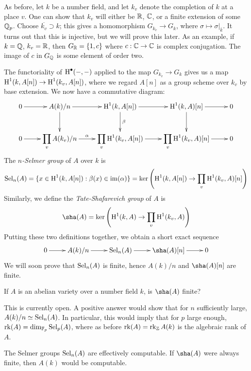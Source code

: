 \documentclass{article}
\begin{document}
As before, let $k$ be a number field, and let $k_v$ denote the completion of 
$k$ at a place $v$. One can show that $k_v$ will either be $\mathbb{R}$, $\mathbb{C}$, or a 
finite extension of some $\mathbb{Q}_p$. Choose $\overline{k_v}\supset k$; this gives 
a homomorphism $G_{k_v} \to G_k$, where $\sigma\mapsto \sigma|_{\bar k}$. It 
turns out that this is injective, but we will prove this later. As an example, 
if $k=\mathbb{Q}$, $k_v=\mathbb{R}$, then $G_{\mathbb{R}}=\{1,c\}$ where $c:\mathbb{C}\to \mathbb{C}$ is complex 
conjugation. The image of $c$ in $G_{\mathbb{Q}}$ is some element of order two. 

The functoriality of $\operatorname{H}^\bullet(-,-)$ applied to the map $G_{k_v} \to G_k$ 
gives us a map $\operatorname{H}^1(k,A[n]) \to \operatorname{H}^1(k_v,A[n])$, where we regard $A[n]$ as a 
group scheme over $k_v$ by base extension. We now have a commutative diagram: 
\[\xymatrix{
  0 \ar[r] 
    & A(k)/n \ar[r] \ar[d] 
    & \h^1(k,A[n]) \ar[r] \ar[d]^-\beta 
    & \h^1(k,A)[n] \ar[r] \ar[d] 
    & 0 \\
  0 \ar[r] 
    & \displaystyle\prod_v A(k_v)/n \ar[r]^-\alpha 
    & \displaystyle\prod_v \h^1(k_v,A[n]) \ar[r] 
    & \displaystyle\prod_v \h^1(k_v,A)[n] \ar[r] 
    & 0
}\]
The \emph{$n$-Selmer group} of $A$ over $k$ is 
\begin{align*}
  \operatorname{Sel}_n(A) = \{x\in \operatorname{H}^1(k,A[n]) : \beta(x) \in \operatorname{im}(\alpha)\} 
    = \ker\left(\operatorname{H}^1(k,A[n]) \to \prod_v \operatorname{H}^1(k_v,A)[n]\right)
\end{align*}
Similarly, we define the \emph{Tate-Shafarevich group} of $A$ is 
\[
  \sha(A) = \ker\left( \h^1(k,A) \to \prod_v \h^1(k_v,A) \right)
\]
Putting these two definitions together, we obtain a short exact 
sequence 
\[\xymatrix{
  0 \ar[r] 
    & A(k)/n \ar[r] 
    & \sel_n(A) \ar[r] 
    & \sha(A)[n] \ar[r] 
    & 0
}\]
We will soon prove that $\operatorname{Sel}_n(A)$ is finite, hence $A(k)/n$ and 
$\sha(A)[n]$ are finite. 

\begin{question}
If $A$ is an abelian variety over a number field $k$, is $\sha(A)$ finite?
\end{question}
This is currently open. A positive answer would show that for $n$ sufficiently 
large, $A(k)/n \simeq \operatorname{Sel}_n(A)$. In particular, this would imply that for $p$ 
large enough, $\operatorname{rk}(A) = \dim_{\mathbb{F}_p} \operatorname{Sel}_p(A)$, where as before 
$\operatorname{rk}(A) = \operatorname{rk}_{\mathbb{Z}} A(k)$ is the algebraic rank of 
$A$. 

\begin{remark}
The Selmer groups $\operatorname{Sel}_n(A)$ are effectively computable. If $\sha(A)$ were 
always finite, then $A(k)$ would be computable. 
\end{remark}
\end{document}
